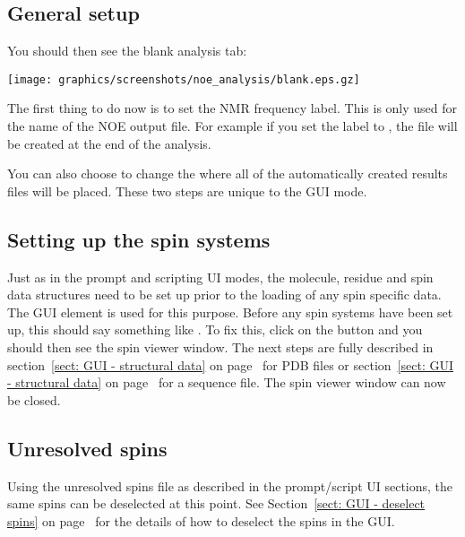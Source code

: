 
\subsection{General setup}

You should then see the blank analysis tab:

\begin{minipage}[h]{\linewidth}
\centerline{\texttt{[image: graphics/screenshots/noe\_analysis/blank.eps.gz]}}
\end{minipage}

The first thing to do now is to set the NMR frequency label.  This is only used for the name of the NOE output file.  For example if you set the label to , the file  will be created at the end of the analysis.

You can also choose to change the  where all of the automatically created results files will be placed.  These two steps are unique to the GUI mode.



\subsection{Setting up the spin systems}

Just as in the prompt and scripting UI modes, the molecule, residue and spin data structures need to be set up prior to the loading of any spin specific data.  The  GUI element is used for this purpose.  Before any spin systems have been set up, this should say something like .  To fix this, click on the  button and you should then see the spin viewer window.  The next steps are fully described in section~\ref{sect: GUI - structural data} on page~\pageref{sect: GUI - structural data} for PDB files or section~\ref{sect: GUI - structural data} on page~\pageref{sect: GUI - structural data} for a sequence file.  The spin viewer window can now be closed.



\subsection{Unresolved spins}

Using the unresolved spins file as described in the prompt/script UI sections, the same spins can be deselected at this point.  See Section~\ref{sect: GUI - deselect spins} on page~\pageref{sect: GUI - deselect spins} for the details of how to deselect the spins in the GUI.


